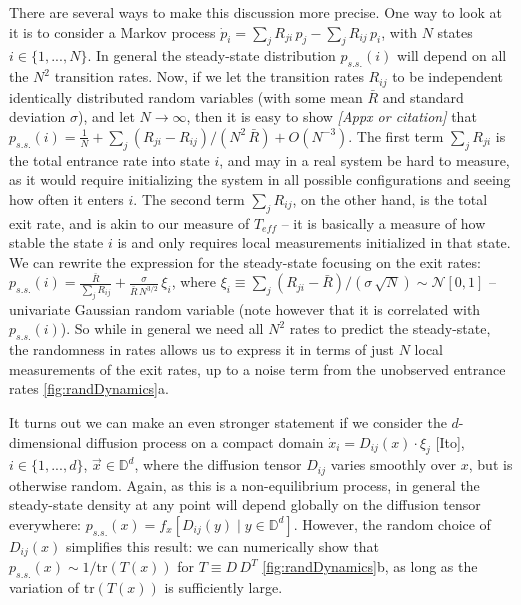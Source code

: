 \documentclass[reprint,prx]{revtex4-1}
\renewcommand{\v}[1]{\ensuremath{\vec{#1}}} %
\newcommand{\tr}{\mbox{tr}}
\renewcommand{\=}[1]{\stackrel{#1}{=}} %
\renewcommand{\(}{\left (}
\renewcommand{\)}{\right  )}
\renewcommand{\[}{\left [}
\renewcommand{\]}{\right ]}
\newcommand{\<}{\left <}
\renewcommand{\>}{\right >}
\theoremstyle{definition}
\theoremstyle{remark}
\newcommand{\bigO}[1]{O\(#1\)}  %
\renewcommand{\todo}[1]{\textit{\color{red}[#1]}}
\begin{document}
There are several ways to make this discussion more precise. One way to look at it is to consider a Markov process $ \dot{p}_i= \sum_j R_{ji}\, p_j - \sum_j R_{ij}\, p_i $, with $ N $ states $ i\in\{1,...,N\} $. In general the steady-state distribution $ p_{s.s.}(i) $ will depend on all the $ N^2 $ transition rates. Now, if we let the transition rates $ R_{ij} $ to be independent identically distributed random variables (with some mean $ \bar{R} $ and standard deviation $ \sigma $), and let $ N \rightarrow \infty$, then it is easy to show \todo{Appx or citation} that $ p_{s.s.}(i)= \frac{1}{N} + \sum_j (R_{ji} - R_{ij})/(N^2\,\bar{R}) + \bigO{N^{-3}}$. The first term $ \sum_j R_{ji} $ is the total entrance rate into state $ i $, and may in a real system be hard to measure, as it would require initializing the system in all possible configurations and seeing how often it enters $ i $. The second term $ \sum_j R_{ij} $, on the other hand, is the total exit rate, and is akin to our measure of $ T_{eff} $ -- it is basically a measure of how stable the state $ i $ is and only requires local measurements initialized in that state. We can rewrite the expression for the steady-state focusing on the exit rates: $ p_{s.s.}(i)= \frac{\bar{R}}{\sum_j R_{ij}} + \frac{\sigma}{\bar{R}\,N^{3/2}}\, \xi_i$, where $ \xi_i \equiv  \sum_j \(R_{ji}-\bar{R}\)/\(\sigma\,\sqrt{N}\)\sim 
\mathcal{N}[0,1]$ -- univariate Gaussian random variable (note however that it is correlated with $ p_{s.s.}(i) $). So while in general we need all $ N^2 $ rates to predict the steady-state, the randomness in rates allows us to express it in terms of just $ N $ local measurements of the exit rates, up to a noise term from  the unobserved entrance rates \ref{fig:randDynamics}a.

It turns out we can make an even stronger statement if we consider the $ d $-dimensional diffusion process on a compact domain $ \dot{x}_i = D_{ij}(x)\cdot\xi_j $ [Ito], $ i\in\{1,...,d\} $, $ \v{x}\in\mathbb{D}^d $, where the diffusion tensor $ D_{ij} $ varies smoothly over $ x $, but is otherwise random. Again, as this is a non-equilibrium process, in general the steady-state density at any point will depend globally on the diffusion tensor everywhere: $ p_{s.s.}(x) = f_x\[D_{ij}(y)\; |\; y\in \mathbb{D}^d \]$. However, the random choice of $ D_{ij}(x) $ simplifies this result: we can numerically show that $ p_{s.s.}(x) \sim 1/\tr\(T(x)\) $ for $ T \equiv D\, D^T$ \ref{fig:randDynamics}b, as long as the variation of $ \tr\(T(x)\) $ is sufficiently large. 
\end{document}
